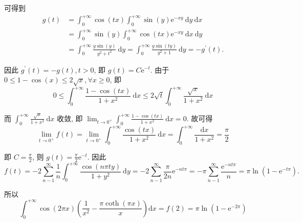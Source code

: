 \begin{solution}
\begin{enumerate}
              可得到
              $$
                  \begin{aligned}
                      g(t) & =\int_0^{+\infty} \cos (t x) \int_0^{+\infty} \sin (y) \mathrm{e}^{-x y} \mathrm{~d} y \mathrm{~d} x                                  \\
                           & =\int_0^{+\infty} \sin (y) \int_0^{+\infty} \cos (t x) \mathrm{e}^{-x y} \mathrm{~d} x \mathrm{~d} y                                  \\
                           & =\int_0^{+\infty} \frac{y \sin (y)}{y^2+t^2} \mathrm{~d} y=\int_0^{+\infty} \frac{y \sin (t y)}{y^2+1} \mathrm{~d} y=-g^{\prime}(t) .
                  \end{aligned}
              $$

              因此 $g^{\prime}(t)=-g(t), t>0$, 即 $g(t)=C \mathrm{e}^{-t}$.
              由于 $0 \leq 1-\cos (x) \leq 2 \sqrt{x}, \forall x \geq 0$, 即
              $$
                  0 \leq \int_0^{+\infty} \frac{1-\cos (t x)}{1+x^2} \mathrm{~d} x \leq 2 \sqrt{t} \int_0^{+\infty} \frac{\sqrt{x}}{1+x^2} \mathrm{~d} x
              $$

              而 $\int_0^{+\infty} \frac{\sqrt{x}}{1+x^2} \mathrm{~d} x$ 收敛, 即 $\lim _{t \rightarrow 0^{+}} \int_0^{+\infty} \frac{1-\cos (t x)}{1+x^2} \mathrm{~d} x=0$. 故可得
              $$
                  \lim _{t \rightarrow 0^{+}} f(t)=\lim _{t \rightarrow 0^{+}} \int_0^{+\infty} \frac{\cos (t x)}{1+x^2} \mathrm{~d} x=\int_0^{+\infty} \frac{\mathrm{d} x}{1+x^2}=\frac{\pi}{2}
              $$

              即 $C=\frac{\pi}{2}$, 则 $g(t)=\frac{\pi}{2} \mathrm{e}^{-t}$. 因此
              $$
                  f(t)=-2 \sum_{n-1}^{\infty} \frac{1}{n} \int_0^{+\infty} \frac{\cos (n \pi t y)}{1+y^2} \mathrm{~d} y=-2 \sum_{n-1}^{\infty} \frac{\pi}{2 n} \mathrm{e}^{-n t \pi}=-\pi \sum_{n-1}^{\infty} \frac{\mathrm{e}^{-n t \pi}}{n}=\pi \ln \left(1-\mathrm{e}^{-t \pi}\right) .
              $$

              所以
              $$
                  \int_0^{+\infty} \cos (2 \pi x)\left(\frac{1}{x^2}-\frac{\pi \operatorname{coth}(\pi x)}{x}\right) \mathrm{d} x=f(2)=\pi \ln \left(1-\mathrm{e}^{-2 \pi}\right)
              $$
    \end{enumerate}
\end{solution}



